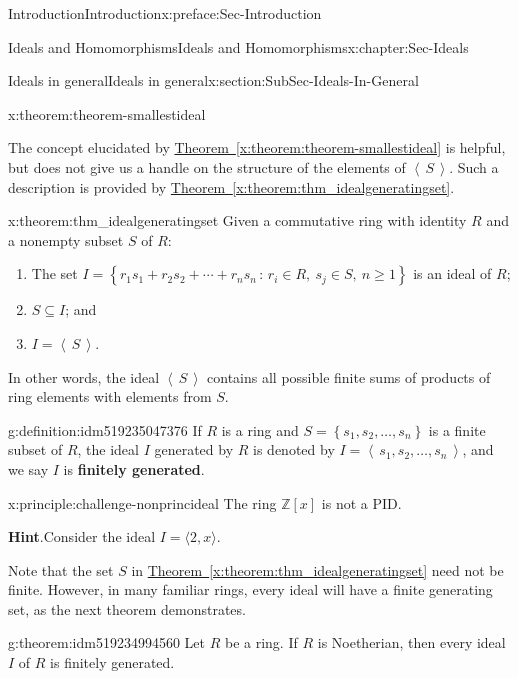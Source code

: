 \documentclass[oneside,10pt,]{book}
\newcommand{\blocktitlefont}{\relax}
\newcommand{\xreffont}{\relax}
\newcommand{\terminology}[1]{\textbf{#1}}
\numberwithin{equation}{section}
\renewcommand{\ge}{\geqslant}
\newcommand{\ideal}[1]{\left\langle\, #1 \,\right\rangle}
\newcommand{\set}[1]{\left\{ {#1} \right\}}
\newcommand{\setof}[2]{{\left\{#1\,\colon\,#2\right\}}}
\def\Z{{\mathbb Z}}
\begin{document}
\begin{preface}{Introduction}{}{Introduction}{}{}{x:preface:Sec-Introduction}
\begin{chapterptx}{Ideals and Homomorphisms}{}{Ideals and Homomorphisms}{}{}{x:chapter:Sec-Ideals}
\begin{sectionptx}{Ideals in general}{}{Ideals in general}{}{}{x:section:SubSec-Ideals-In-General}
\begin{theorem}{}{}{x:theorem:theorem-smallestideal}
\end{theorem}
The concept elucidated by \hyperref[x:theorem:theorem-smallestideal]{Theorem~{\xreffont\ref{x:theorem:theorem-smallestideal}}} is helpful, but does not give us a handle on the structure of the elements of \(\ideal{S}\). Such a description is provided by \hyperref[x:theorem:thm_idealgeneratingset]{Theorem~{\xreffont\ref{x:theorem:thm_idealgeneratingset}}}.%
\begin{theorem}{}{}{x:theorem:thm_idealgeneratingset}%
Given a commutative ring with identity \(R\) and a nonempty subset \(S\) of \(R\):%
\begin{enumerate}
\item{}The set \(I = \setof{r_1 s_1 + r_2 s_2 + \cdots + r_n s_n}{r_i\in R, \ s_j \in S,\ n\ge 1}\) is an ideal of \(R\);%
\item{}\(S\subseteq I\); and%
\item{}\(I = \ideal{S}\).%
\end{enumerate}
%
\end{theorem}
In other words, the ideal \(\ideal{S}\) contains all possible finite sums of products of ring elements with elements from \(S\).%
\begin{definition}{}{g:definition:idm519235047376}%
If \(R\) is a ring and \(S = \set{s_1, s_2, \ldots,
s_n}\) is a finite subset of \(R\), the ideal \(I\) generated by \(R\) is denoted by \(I = \ideal{s_1, s_2, \ldots,
s_n}\), and we say \(I\) is \terminology{finitely generated}.%
\end{definition}
\begin{principle}{}{}{x:principle:challenge-nonprincideal}%
The ring \(\Z[x]\) is not a PID.%


\textbf{\blocktitlefont Hint}.\quad{}Consider the ideal \(I = \langle 2, x \rangle\).%
\end{principle}
Note that the set \(S\) in \hyperref[x:theorem:thm_idealgeneratingset]{Theorem~{\xreffont\ref{x:theorem:thm_idealgeneratingset}}} need not be finite. However, in many familiar rings, every ideal will have a finite generating set, as the next theorem demonstrates.%
\begin{theorem}{}{}{g:theorem:idm519234994560}%
Let \(R\) be a ring. If \(R\) is Noetherian\footnotemark{}, then every ideal \(I\) of \(R\) is finitely generated.%



\end{theorem}
\end{sectionptx}
\end{chapterptx}
\end{preface}
\end{document}
